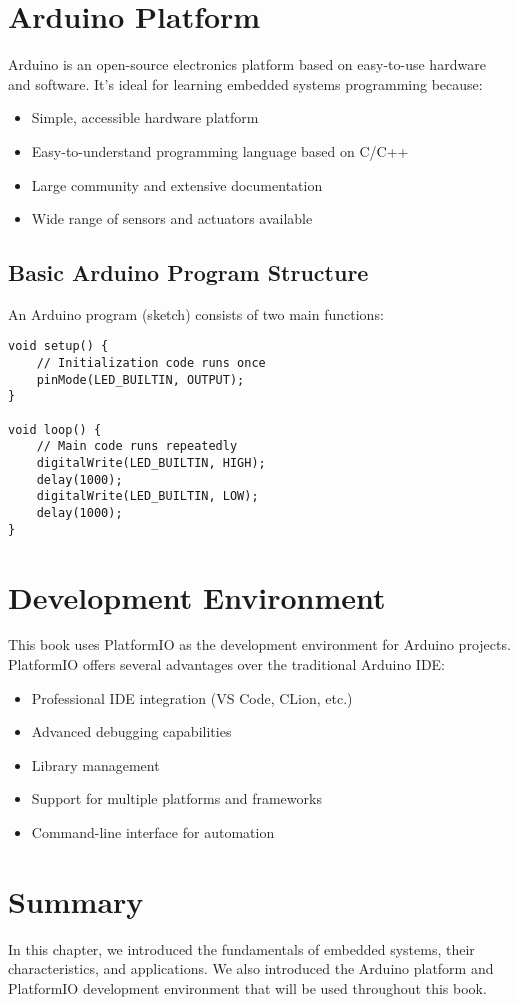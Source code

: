 \section{Arduino Platform}

Arduino is an open-source electronics platform based on easy-to-use hardware and software. It's ideal for learning embedded systems programming because:

\begin{itemize}
    \item Simple, accessible hardware platform
    \item Easy-to-understand programming language based on C/C++
    \item Large community and extensive documentation
    \item Wide range of sensors and actuators available
\end{itemize}

\subsection{Basic Arduino Program Structure}

An Arduino program (sketch) consists of two main functions:

\begin{lstlisting}[caption=Basic Arduino Structure]
void setup() {
    // Initialization code runs once
    pinMode(LED_BUILTIN, OUTPUT);
}

void loop() {
    // Main code runs repeatedly
    digitalWrite(LED_BUILTIN, HIGH);
    delay(1000);
    digitalWrite(LED_BUILTIN, LOW);
    delay(1000);
}
\end{lstlisting}

\section{Development Environment}

This book uses PlatformIO as the development environment for Arduino projects. PlatformIO offers several advantages over the traditional Arduino IDE:

\begin{itemize}
    \item Professional IDE integration (VS Code, CLion, etc.)
    \item Advanced debugging capabilities
    \item Library management
    \item Support for multiple platforms and frameworks
    \item Command-line interface for automation
\end{itemize}

\section{Summary}

In this chapter, we introduced the fundamentals of embedded systems, their characteristics, and applications. We also introduced the Arduino platform and PlatformIO development environment that will be used throughout this book.
